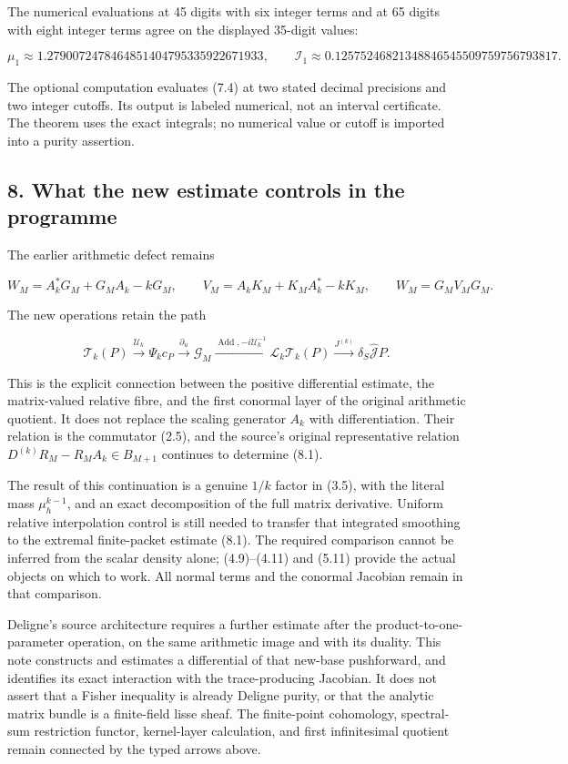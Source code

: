 \documentclass[
]{article}
\begin{document}
The numerical evaluations at 45 digits with six integer terms and at 65
digits with eight integer terms agree on the displayed 35-digit values:

\[\mu_1\approx1.2790072478464851404795335922671933,\qquad
\mathcal I_1\approx0.12575246821348846545509759756793817.\]

The optional computation evaluates (7.4) at two stated decimal
precisions and two integer cutoffs. Its output is labeled numerical, not
an interval certificate. The theorem uses the exact integrals; no
numerical value or cutoff is imported into a purity assertion.

\subsection{8. What the new estimate controls in the
programme}\label{what-the-new-estimate-controls-in-the-programme}

The earlier arithmetic defect remains

\[W_M=A_k^*G_M+G_MA_k-kG_M,\qquad V_M=A_kK_M+K_MA_k^*-kK_M,\qquad W_M=G_MV_MG_M.\tag{8.1}\]

The new operations retain the path

\[\mathcal T_k(P)\xrightarrow{\mathscr U_k}\Psi_k c_P
\xrightarrow{\partial_u}\mathscr G_M
\xrightarrow{\operatorname{Add},-i\mathscr U_k^{-1}}\mathscr L_k\mathcal T_k(P)
\xrightarrow{J^{(k)}}\delta_S\widehat{\mathcal J}P.\tag{8.2}\]

This is the explicit connection between the positive differential
estimate, the matrix-valued relative fibre, and the first conormal layer
of the original arithmetic quotient. It does not replace the scaling
generator \(A_k\) with differentiation. Their relation is the commutator
(2.5), and the source's original representative relation
\(D^{(k)}R_M-R_MA_k\in B_{M+1}\) continues to determine (8.1).

The result of this continuation is a genuine \(1/k\) factor in (3.5),
with the literal mass \(\mu_h^{k-1}\), and an exact decomposition of the
full matrix derivative. Uniform relative interpolation control is still
needed to transfer that integrated smoothing to the extremal
finite-packet estimate (8.1). The required comparison cannot be inferred
from the scalar density alone; (4.9)--(4.11) and (5.11) provide the
actual objects on which to work. All normal terms and the conormal
Jacobian remain in that comparison.

Deligne's source architecture requires a further estimate after the
product-to-one-parameter operation, on the same arithmetic image and
with its duality. This note constructs and estimates a differential of
that new-base pushforward, and identifies its exact interaction with the
trace-producing Jacobian. It does not assert that a Fisher inequality is
already Deligne purity, or that the analytic matrix bundle is a
finite-field lisse sheaf. The finite-point cohomology, spectral-sum
restriction functor, kernel-layer calculation, and first infinitesimal
quotient remain connected by the typed arrows above.
\end{document}
